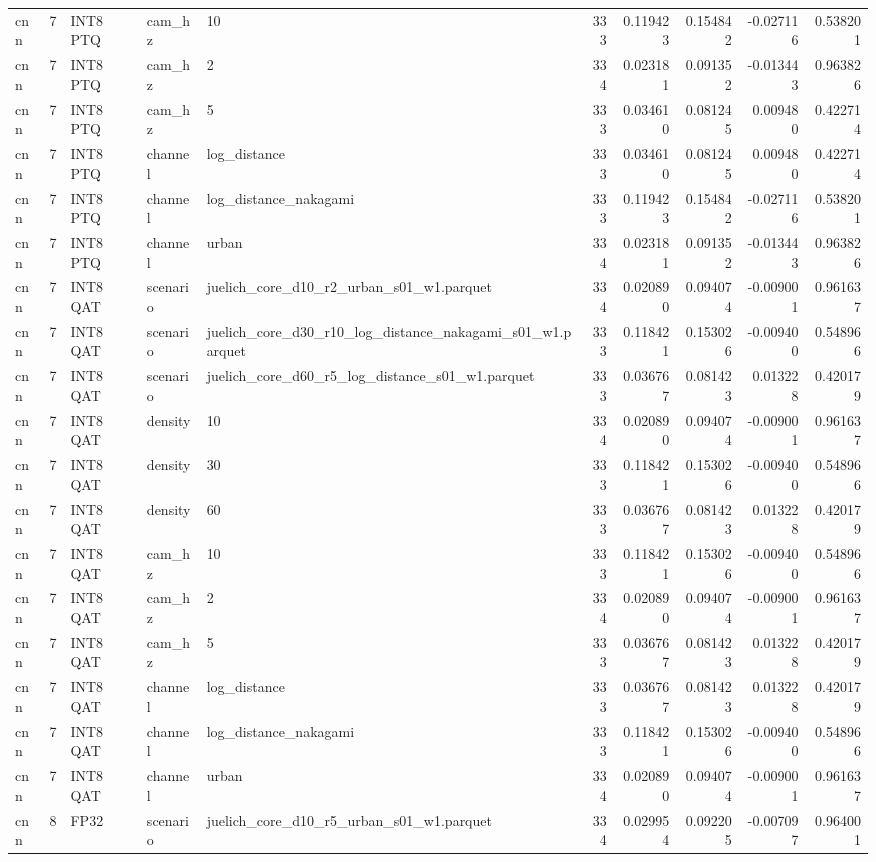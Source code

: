 \begin{tabular}{lrlllrrrrr}
cnn & 7 & INT8 PTQ & cam\_hz & 10 & 333 & 0.119423 & 0.154842 & -0.027116 & 0.538201 \\
cnn & 7 & INT8 PTQ & cam\_hz & 2 & 334 & 0.023181 & 0.091352 & -0.013443 & 0.963826 \\
cnn & 7 & INT8 PTQ & cam\_hz & 5 & 333 & 0.034610 & 0.081245 & 0.009480 & 0.422714 \\
cnn & 7 & INT8 PTQ & channel & log\_distance & 333 & 0.034610 & 0.081245 & 0.009480 & 0.422714 \\
cnn & 7 & INT8 PTQ & channel & log\_distance\_nakagami & 333 & 0.119423 & 0.154842 & -0.027116 & 0.538201 \\
cnn & 7 & INT8 PTQ & channel & urban & 334 & 0.023181 & 0.091352 & -0.013443 & 0.963826 \\
cnn & 7 & INT8 QAT & scenario & juelich\_core\_d10\_r2\_urban\_s01\_w1.parquet & 334 & 0.020890 & 0.094074 & -0.009001 & 0.961637 \\
cnn & 7 & INT8 QAT & scenario & juelich\_core\_d30\_r10\_log\_distance\_nakagami\_s01\_w1.parquet & 333 & 0.118421 & 0.153026 & -0.009400 & 0.548966 \\
cnn & 7 & INT8 QAT & scenario & juelich\_core\_d60\_r5\_log\_distance\_s01\_w1.parquet & 333 & 0.036767 & 0.081423 & 0.013228 & 0.420179 \\
cnn & 7 & INT8 QAT & density & 10 & 334 & 0.020890 & 0.094074 & -0.009001 & 0.961637 \\
cnn & 7 & INT8 QAT & density & 30 & 333 & 0.118421 & 0.153026 & -0.009400 & 0.548966 \\
cnn & 7 & INT8 QAT & density & 60 & 333 & 0.036767 & 0.081423 & 0.013228 & 0.420179 \\
cnn & 7 & INT8 QAT & cam\_hz & 10 & 333 & 0.118421 & 0.153026 & -0.009400 & 0.548966 \\
cnn & 7 & INT8 QAT & cam\_hz & 2 & 334 & 0.020890 & 0.094074 & -0.009001 & 0.961637 \\
cnn & 7 & INT8 QAT & cam\_hz & 5 & 333 & 0.036767 & 0.081423 & 0.013228 & 0.420179 \\
cnn & 7 & INT8 QAT & channel & log\_distance & 333 & 0.036767 & 0.081423 & 0.013228 & 0.420179 \\
cnn & 7 & INT8 QAT & channel & log\_distance\_nakagami & 333 & 0.118421 & 0.153026 & -0.009400 & 0.548966 \\
cnn & 7 & INT8 QAT & channel & urban & 334 & 0.020890 & 0.094074 & -0.009001 & 0.961637 \\
cnn & 8 & FP32 & scenario & juelich\_core\_d10\_r5\_urban\_s01\_w1.parquet & 334 & 0.029954 & 0.092205 & -0.007097 & 0.964001 \\

\end{tabular}
